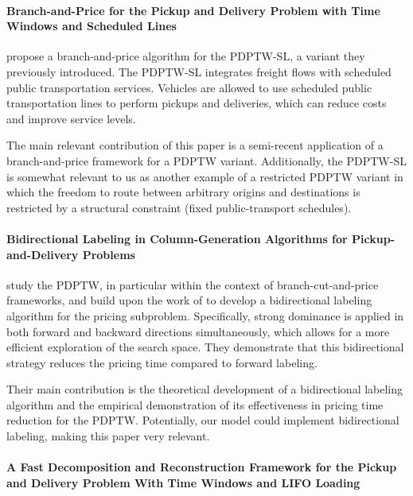 \documentclass[preprint,11pt,authoryear]{elsarticle}
\begin{document}
\paragraph{\textbf{Branch-and-Price for the Pickup and Delivery Problem with Time Windows and Scheduled Lines}}

\citet{ghilasBranchandPricePickupDelivery2018} propose a branch-and-price algorithm for the PDPTW-SL, a variant they previously introduced. The PDPTW-SL integrates freight flows 
with scheduled public transportation services. Vehicles are allowed to use scheduled public transportation lines to perform pickups and deliveries, which can reduce costs and improve service levels.

The main relevant contribution of this paper is a semi-recent application of a branch-and-price framework for a PDPTW variant. Additionally, 
the PDPTW-SL is somewhat relevant to us as another example of a restricted PDPTW variant in which the freedom to route between arbitrary origins and 
destinations is restricted by a structural constraint (fixed public-transport schedules). 


\paragraph{\textbf{Bidirectional Labeling in Column-Generation Algorithms for Pickup-and-Delivery Problems}}

\citet{gschwindBidirectionalLabelingColumngeneration2018} study the PDPTW, in particular within the context of branch-cut-and-price frameworks, 
and build upon the work of \citet{ropkeBranchCutPrice2009} to develop a bidirectional labeling algorithm for the pricing subproblem.
Specifically, strong dominance is applied in both forward and backward directions simultaneously, which allows for a more efficient exploration of the search space.
They demonstrate that this bidirectional strategy reduces the pricing time compared to forward labeling.

Their main contribution is the theoretical development of a bidirectional labeling algorithm and the empirical demonstration of 
its effectiveness in pricing time reduction for the PDPTW. Potentially, our model could implement bidirectional labeling, making this paper very relevant.


\paragraph{\textbf{A Fast Decomposition and Reconstruction Framework for the Pickup and Delivery Problem With Time Windows and LIFO Loading}}
\end{document}
